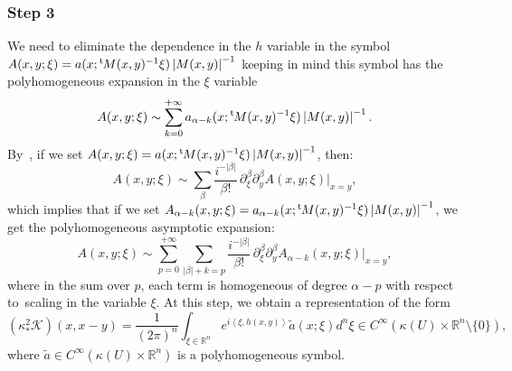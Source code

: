 \documentclass[10pt]{amsart}
\let\pazocal\mathscr
\theoremstyle{definition}
\let\cv\alpha
\let\asigma a
\newcommand{\module}[1]{\left|#1\right|}
\newcommand{\step}[1]{\subsubsection*{Step #1}}
\renewcommand{\t}{{{}^{\mathrm{t}\mkern-2mu}}}
\begin{document}
\step{3} We need to eliminate the dependence in the $h$ variable in the symbol $A(x,y;\xi)= \asigma(x; \t M(x,y)^{-1} \xi)\module{M(x,y)}^{-1}$
keeping in mind this symbol has the polyhomogeneous expansion in the $\xi$ variable
\[
A(x,y;\xi)\sim \sum_{k=0}^{+\infty}\asigma_{\cv-k}(x; \t M(x,y)^{-1} \xi)\module{M(x,y)}^{-1}.
\]
By~\cite[Th.\,3.1]{shubin}, if we set $A(x,y;\xi)=\asigma(x; \t M(x,y)^{-1}\xi)\module{M(x,y)}^{-1}$,
then:
\[
A(x,y;\xi)\sim {\sum_\beta} \frac{i^{-\vert \beta\vert}}{\beta !}\, \partial_\xi^\beta \partial_y^\beta A(x,y;\xi) |_{x=y},
\]
which implies that if we set $A_{\cv-k}(x,y;\xi)=\asigma_{\cv-k}(x; \t M(x,y)^{-1} \xi)\module{M(x,y)}^{-1}$, we get
the polyhomogeneous asymptotic expansion:
\begin{equation}\label{e:exp1referee}
A(x,y;\xi)\sim \sum_{p=0}^{+\infty} \sum_{\vert \beta\vert+k=p } \frac{i^{-\vert \beta\vert}}{\beta !}\, \partial_\xi^\beta \partial_y^\beta A_{\cv-k}(x,y;\xi) |_{x=y},
\end{equation}
where in the sum over $p$, each term is homogeneous of degree $\cv-p$ with respect to~scaling in the variable $\xi$.
At this step,
we obtain a representation of the form
\begin{equation*}%
{\left(\kappa^2_*\pazocal{K}\right)}(x,x-y)=\frac{1}{(2\pi)^n}\int_{\xi\in \mathbb{R}^n} e^{i\left\langle \xi,h(x,y)\right\rangle} \tilde{\asigma}(x; \xi) d^n\xi \in C^\infty(\kappa(U)\times \mathbb{R}^n\setminus\{0\}),
\end{equation*}
where $\tilde{\asigma}\in C^\infty(\kappa(U)\times \mathbb{R}^n)$ is a polyhomogeneous symbol.
\end{document}
